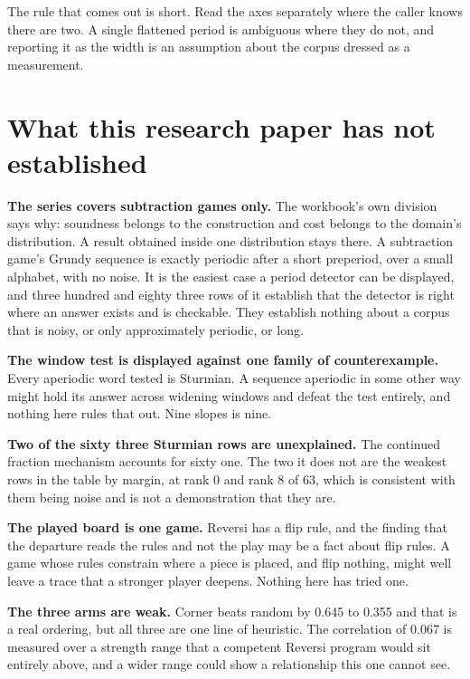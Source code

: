 The rule that comes out is short. Read the axes separately where the caller knows there are two. A
single flattened period is ambiguous where they do not, and reporting it as the width is an
assumption about the corpus dressed as a measurement.

\section{What this research paper has not established}

\textbf{The series covers subtraction games only.} The workbook's own division~\cite{src:Quigg-orior-workbook} says why: soundness
belongs to the construction and cost belongs to the domain's distribution. A result obtained inside
one distribution stays there. A subtraction game's Grundy sequence is exactly periodic after a short
preperiod, over a small alphabet, with no noise. It is the easiest case a period detector can be
displayed, and three hundred and eighty three rows of it establish that the
detector is right where an answer exists and is checkable. They establish nothing about a corpus
that is noisy, or only approximately periodic, or long.

\textbf{The window test is displayed against one family of counterexample.} Every aperiodic word tested
is Sturmian. A sequence aperiodic in some other way might hold its answer across widening windows and
defeat the test entirely, and nothing here rules that out. Nine slopes is nine.

\textbf{Two of the sixty three Sturmian rows are unexplained.} The continued fraction mechanism
accounts for sixty one. The two it does not are the weakest rows in the table by margin, at rank 0
and rank 8 of 63, which is consistent with them being noise and is not a demonstration that they are.

\textbf{The played board is one game.} Reversi has a flip rule, and the finding that the departure
reads the rules and not the play may be a fact about flip rules. A game whose rules constrain where
a piece is placed, and flip nothing, might well leave a trace that a stronger player deepens. Nothing
here has tried one.

\textbf{The three arms are weak.} Corner beats random by 0.645 to 0.355 and that is a real ordering,
but all three are one line of heuristic. The correlation of 0.067 is measured over a strength range
that a competent Reversi program would sit entirely above, and a wider range could show a
relationship this one cannot see.


